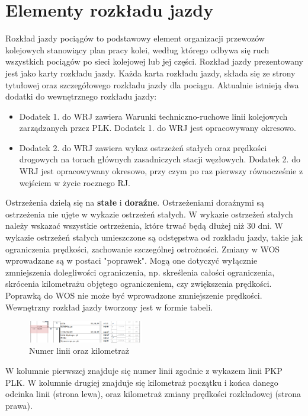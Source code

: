 \section{Elementy rozkładu jazdy}
Rozkład jazdy pociągów to podstawowy element organizacji przewozów kolejowych stanowiący plan pracy kolei, według którego odbywa się ruch wszystkich pociągów po sieci kolejowej lub jej części.  Rozkład jazdy prezentowany jest jako karty rozkładu jazdy. Każda karta rozkładu jazdy, składa się ze strony tytułowej oraz szczegółowego rozkładu jazdy dla pociągu. Aktualnie istnieją dwa dodatki do wewnętrznego rozkładu jazdy:
\begin{tcolorbox}[colback=green!5!white,colframe=green!75!black,width=0.47\textwidth,title=Dodatki do rozkładu jazdy]
\begin{itemize}
	\item Dodatek 1. do WRJ zawiera Warunki techniczno-ruchowe linii kolejowych zarządzanych przez PLK. Dodatek 1. do WRJ jest
	opracowywany okresowo.
	\item Dodatek 2. do WRJ zawiera wykaz ostrzeżeń stałych oraz prędkości drogowych na torach głównych zasadniczych stacji
	węzłowych. Dodatek 2. do WRJ jest opracowywany okresowo, przy czym po raz pierwszy równocześnie z wejściem w życie rocznego RJ.
\end{itemize}
\end{tcolorbox}
Ostrzeżenia dzielą się na \textbf{stałe} i \textbf{doraźne}. Ostrzeżeniami doraźnymi są ostrzeżenia nie ujęte w wykazie ostrzeżeń stałych. W wykazie ostrzeżeń stałych należy wskazać wszystkie ostrzeżenia, które trwać będą dłużej niż 30 dni.
W wykazie ostrzeżeń stałych umieszczone są odstępstwa od rozkładu jazdy, takie jak ograniczenia prędkości, zachowanie szczególnej ostrożności. Zmiany w WOS wprowadzane są w postaci "poprawek". Mogą one dotyczyć wyłącznie zmniejszenia dolegliwości ograniczenia, np. skreślenia całości ograniczenia, skrócenia kilometrażu objętego ograniczeniem, czy zwiększenia prędkości. Poprawką do WOS nie może być wprowadzone zmniejszenie prędkości. 
Wewnętrzny rozkład jazdy tworzony jest w formie tabeli. \begin{figure}
	\includegraphics[width=0.45\textwidth]{skryptkierownik-img/numer-linii.png}
	\caption{Numer linii oraz kilometraż}
\end{figure} W kolumnie pierwszej znajduje się numer linii zgodnie z wykazem linii PKP PLK. W kolumnie drugiej znajduje się kilometraż początku i końca danego odcinka linii (strona lewa), oraz kilometraż zmiany prędkości rozkładowej (strona prawa). 

